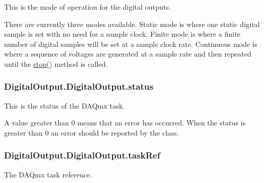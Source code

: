 This is the mode of operation for the digital outputs. 

There are currently three modes available. Static mode is where one static digital sample is set with no need for a sample clock. Finite mode is where a finite number of digital samples will be set at a sample clock rate. Continuous mode is where a sequence of voltages are generated at a sample rate and then repeated until the \hyperlink{class_digital_output_1_1_digital_output_a7f5784b1fdea30aaddc1d608357accf1}{stop()} method is called. \hypertarget{class_digital_output_1_1_digital_output_ad4c856a2b8d101078add570f1a5843a3}{
\subsubsection[{status}]{\setlength{\rightskip}{0pt plus 5cm}Digital\-Output.\-Digital\-Output.\-status}}\label{class_digital_output_1_1_digital_output_ad4c856a2b8d101078add570f1a5843a3}


This is the status of the D\-A\-Qmx task. 

A value greater than 0 means that an error has occurred. When the status is greater than 0 an error should be reported by the class. \hypertarget{class_digital_output_1_1_digital_output_a2aeeacbf158f4acfdcb0461327396d98}{
\subsubsection[{task\-Ref}]{\setlength{\rightskip}{0pt plus 5cm}Digital\-Output.\-Digital\-Output.\-task\-Ref}}\label{class_digital_output_1_1_digital_output_a2aeeacbf158f4acfdcb0461327396d98}


The D\-A\-Qmx task reference. 




